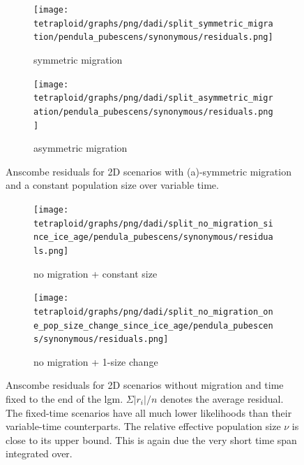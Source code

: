 \documentclass[hidelinks,11pt]{article}
\begin{document}
    \begin{figure}[H]
        \centering
        \begin{subfigure}[b]{0.49\textwidth}
            \texttt{[image: tetraploid/graphs/png/dadi/split\_symmetric\_migration/pendula\_pubescens/synonymous/residuals.png]}
            \caption{symmetric migration}
        \end{subfigure}
        \hfill
        \begin{subfigure}[b]{0.5\textwidth}
            \texttt{[image: tetraploid/graphs/png/dadi/split\_asymmetric\_migration/pendula\_pubescens/synonymous/residuals.png]}
            \caption{asymmetric migration}
        \end{subfigure}
        \caption{Anscombe residuals for 2D scenarios with (a)-symmetric migration and a constant population size over variable time.}
        \label{fig:dadi_2d_residuals_variable_time_migration_constant_size}
    \end{figure}

    \begin{figure}[H]
        \centering
        \begin{subfigure}[b]{0.49\textwidth}
            \texttt{[image: tetraploid/graphs/png/dadi/split\_no\_migration\_since\_ice\_age/pendula\_pubescens/synonymous/residuals.png]}
            \caption{no migration + constant size}
        \end{subfigure}
        \hfill
        \begin{subfigure}[b]{0.49\textwidth}
            \texttt{[image: tetraploid/graphs/png/dadi/split\_no\_migration\_one\_pop\_size\_change\_since\_ice\_age/pendula\_pubescens/synonymous/residuals.png]}
            \caption{no migration + 1-size change}
        \end{subfigure}
        \caption{Anscombe residuals for 2D scenarios without migration and time fixed to the end of the \acrshort{lgm}. $\Sigma |r_i|/n$ denotes the average residual. The fixed-time scenarios have all much lower likelihoods than their variable-time counterparts. The relative effective population size $\nu$ is close to its upper bound. This is again due the very short time span integrated over.}
        \label{fig:dadi_2d_residuals_no_migration_fixed_time}
    \end{figure}
\end{document}
